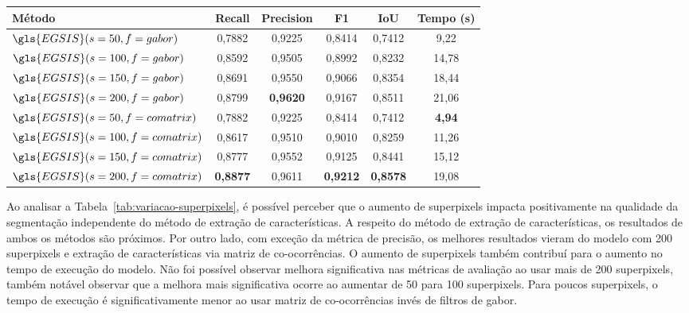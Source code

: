 \begin{table}[!h]
    \centering
  \begin{tabular}{lccccc}
    \toprule
    \textbf{Método}                  & \textbf{Recall} & \textbf{Precision} & \textbf{F1}     & \textbf{IoU}    & \textbf{Tempo (s)} \\
    \midrule \midrule
    $\gls{EGSIS}(s=50, f=gabor)$     & 0,7882          & 0,9225             & 0,8414          & 0,7412          & 9,22             \\
    $\gls{EGSIS}(s=100, f=gabor)$    & 0,8592          & 0,9505             & 0,8992          & 0,8232          & 14,78            \\
    $\gls{EGSIS}(s=150, f=gabor)$    & 0,8691          & 0,9550             & 0,9066          & 0,8354          & 18,44            \\
    $\gls{EGSIS}(s=200, f=gabor)$    & 0,8799          & \textbf{0,9620}    & 0,9167          & 0,8511          & 21,06            \\
    $\gls{EGSIS}(s=50, f=comatrix)$  & 0,7882          & 0,9225             & 0,8414          & 0,7412          & \textbf{4,94}    \\
    $\gls{EGSIS}(s=100, f=comatrix)$ & 0,8617          & 0,9510             & 0,9010          & 0,8259          & 11,26            \\
    $\gls{EGSIS}(s=150, f=comatrix)$ & 0,8777          & 0,9552             & 0,9125          & 0,8441          & 15,12            \\
    $\gls{EGSIS}(s=200, f=comatrix)$ & \textbf{0,8877} & 0,9611             & \textbf{0,9212} & \textbf{0,8578} & 19,08            \\
    \bottomrule
  \end{tabular}
  \Fonte{\fonteautor}
\end{table}

Ao analisar a Tabela~\ref{tab:variacao-superpixels}, é possível
perceber que o aumento de superpixels impacta positivamente na
qualidade da segmentação independente do método de extração de
características. A respeito do método de extração de características,
os resultados de ambos os métodos são próximos. Por outro lado, com
exceção da métrica de precisão, os melhores resultados vieram do
modelo com 200 superpixels e extração de características via matriz de
co-ocorrências. O aumento de superpixels também contribuí para o
aumento no tempo de execução do modelo. Não foi possível observar
melhora significativa nas métricas de avaliação ao usar mais de 200
superpixels, também notável observar que a melhora mais significativa
ocorre ao aumentar de 50 para 100 superpixels. Para poucos
superpixels, o tempo de execução é significativamente menor ao usar
matriz de co-ocorrências invés de filtros de gabor.


